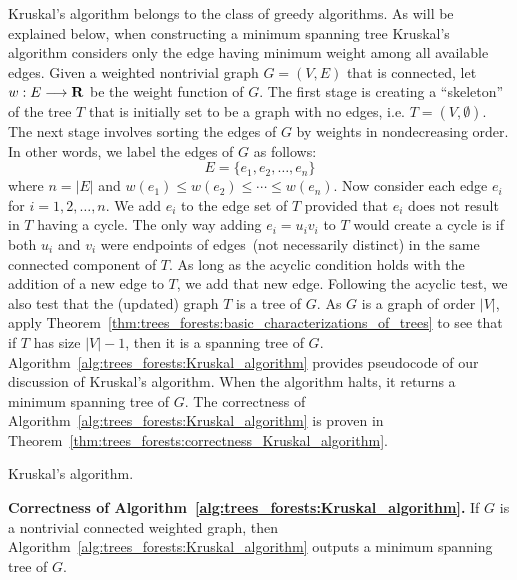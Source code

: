 Kruskal's algorithm belongs to the class of greedy algorithms. As will
be explained below, when constructing a minimum spanning tree
Kruskal's algorithm considers only the edge having minimum weight
among all available edges. Given a weighted nontrivial graph
$G = (V,E)$ that is connected, let $w: E \longrightarrow \mathbf{R}$ be the weight
function of $G$. The first stage is creating a ``skeleton'' of the
tree $T$ that is initially set to be a graph with no edges, i.e.
$T = (V, \emptyset)$. The next stage involves sorting the edges of $G$
by weights in nondecreasing order. In other words, we label the edges
of $G$ as follows:
\[
E
=
\{e_1, e_2, \dots, e_n\}
\]
where $n = |E|$ and $w(e_1) \leq w(e_2) \leq \cdots \leq w(e_n)$.
Now consider each edge $e_i$ for $i = 1,2,\dots,n$. We add $e_i$ to
the edge set of $T$ provided that $e_i$ does not result in $T$ having
a cycle. The only way adding $e_i = u_i v_i$ to $T$ would create a
cycle is if both $u_i$ and $v_i$ were endpoints of edges~(not
necessarily distinct) in the same connected component of $T$. As long
as the acyclic condition holds with the addition of a new edge to $T$,
we add that new edge. Following the acyclic test, we also test that
the (updated) graph $T$ is a tree of $G$. As $G$ is a graph of order
$|V|$, apply
Theorem~\ref{thm:trees_forests:basic_characterizations_of_trees} to
see that if $T$ has size $|V| - 1$, then it is a spanning tree of
$G$. Algorithm~\ref{alg:trees_forests:Kruskal_algorithm} provides
pseudocode of our discussion of Kruskal's algorithm. When the
algorithm halts, it returns a minimum spanning tree of $G$. The
correctness of Algorithm~\ref{alg:trees_forests:Kruskal_algorithm} is
proven in Theorem~\ref{thm:trees_forests:correctness_Kruskal_algorithm}.

\begin{algorithm}[!htpb]

\caption{Kruskal's algorithm.}
\label{alg:trees_forests:Kruskal_algorithm}
\end{algorithm}

\begin{theorem}
\label{thm:trees_forests:correctness_Kruskal_algorithm}
\textbf{Correctness of Algorithm~\ref{alg:trees_forests:Kruskal_algorithm}.}
If $G$ is a nontrivial connected weighted graph, then
Algorithm~\ref{alg:trees_forests:Kruskal_algorithm} outputs a minimum
spanning tree of $G$.
\end{theorem}

